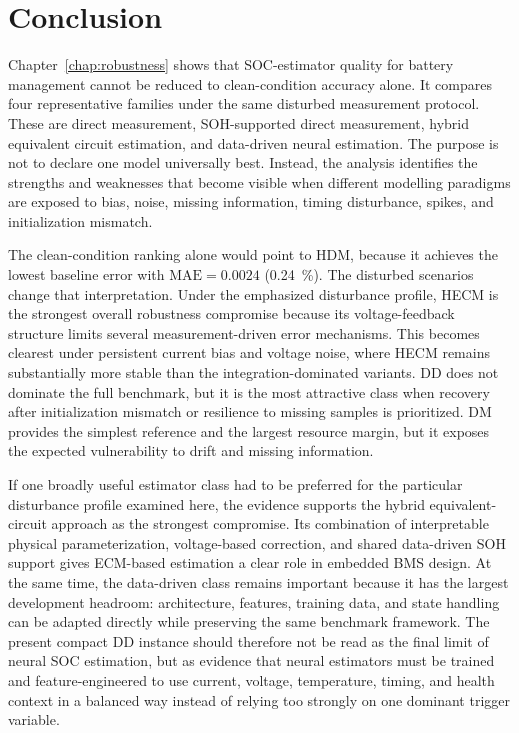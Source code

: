 \documentclass[
    a4paper,
    12pt,
    titlepage,
    bibliography=totoc,
    twoside=on,
    parskip=false,
    numbers=noenddot,
    cleardoublepage=empty,
    DIV=12,
    BCOR=12.0mm,
    headheight=36pt,
    headings=openright
]{scrreprt}
\begin{document}
\section{Conclusion}
Chapter~\ref{chap:robustness} shows that SOC-estimator quality for battery management cannot be reduced to clean-condition accuracy alone. It compares four representative families under the same disturbed measurement protocol. These are direct measurement, SOH-supported direct measurement, hybrid equivalent circuit estimation, and data-driven neural estimation. The purpose is not to declare one model universally best. Instead, the analysis identifies the strengths and weaknesses that become visible when different modelling paradigms are exposed to bias, noise, missing information, timing disturbance, spikes, and initialization mismatch.

The clean-condition ranking alone would point to HDM, because it achieves the lowest baseline error with $\mathrm{MAE}=0.0024$ (\SI{0.24}{\percent}). The disturbed scenarios change that interpretation. Under the emphasized disturbance profile, HECM is the strongest overall robustness compromise because its voltage-feedback structure limits several measurement-driven error mechanisms. This becomes clearest under persistent current bias and voltage noise, where HECM remains substantially more stable than the integration-dominated variants. DD does not dominate the full benchmark, but it is the most attractive class when recovery after initialization mismatch or resilience to missing samples is prioritized. DM provides the simplest reference and the largest resource margin, but it exposes the expected vulnerability to drift and missing information.

If one broadly useful estimator class had to be preferred for the particular disturbance profile examined here, the evidence supports the hybrid equivalent-circuit approach as the strongest compromise. Its combination of interpretable physical parameterization, voltage-based correction, and shared data-driven SOH support gives ECM-based estimation a clear role in embedded BMS design. At the same time, the data-driven class remains important because it has the largest development headroom: architecture, features, training data, and state handling can be adapted directly while preserving the same benchmark framework. The present compact DD instance should therefore not be read as the final limit of neural SOC estimation, but as evidence that neural estimators must be trained and feature-engineered to use current, voltage, temperature, timing, and health context in a balanced way instead of relying too strongly on one dominant trigger variable.
\end{document}
